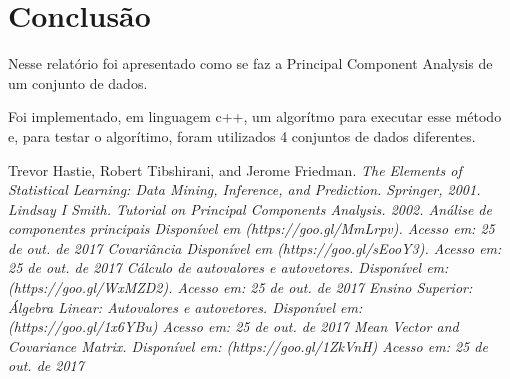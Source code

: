 \documentclass[a4paper, 11pt]{article}
\begin{document}
\section*{Conclusão}
Nesse relatório foi apresentado como se faz a Principal Component Analysis de um conjunto de dados. 

Foi implementado, em linguagem c++, um algorítmo para executar esse método e, para testar o algorítimo, foram utilizados 4 conjuntos de dados diferentes.



\begin{thebibliography}{9}
Trevor Hastie, Robert Tibshirani, and Jerome Friedman.
\newblock \em{The Elements of Statistical Learning: Data Mining, Inference,
  and Prediction}.
\newblock Springer, 2001.
 Lindsay I Smith. \em{Tutorial on Principal Components Analysis}. 2002.
 \em{Análise de componentes principais} \newblock Disponível em (https://goo.gl/MmLrpv). \newblock Acesso em: 25 de out. de 2017
 \em{Covariância} \newblock Disponível em (https://goo.gl/sEooY3). \newblock Acesso em: 25 de out. de 2017
 \em{Cálculo de autovalores e autovetores.} \newblock Disponível em: (https://goo.gl/WxMZD2). \newblock Acesso em: 25 de out. de 2017
 \em{Ensino Superior: Álgebra Linear: Autovalores e autovetores.} \newblock Disponível em: (https://goo.gl/1x6YBu) \newblock Acesso em: 25 de out. de 2017
 \em{Mean Vector and Covariance Matrix.} \newblock Disponível em: (https://goo.gl/1ZkVnH) \newblock Acesso em: 25 de out. de 2017
\end{thebibliography}
\end{document}
